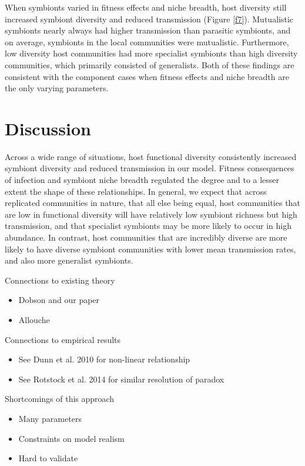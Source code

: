 \documentclass[12pt]{article}
\begin{document}
When symbionts varied in fitness effects and niche breadth, host diversity still increased symbiont diversity and reduced transmission (Figure \ref{f7}). 
Mutualistic symbionts nearly always had higher transmission than parasitic symbionts, and on average, symbionts in the local communities were mutualistic. 
Furthermore, low diversity host communities had more specialist symbionts than high diversity communities, which primarily consisted of generalists. 
Both of these findings are consistent with the component cases when fitness effects and niche breadth are the only varying parameters.

\section*{Discussion}

Across a wide range of situations, host functional diversity consistently increased symbiont diversity and reduced transmission in our model. 
Fitness consequences of infection and symbiont niche breadth regulated the degree and to a lesser extent the shape of these relationships.
In general, we expect that across replicated communities in nature, that all else being equal, host communities that are low in functional diversity will have relatively low symbiont richness but high transmission, and that specialist symbionts may be more likely to occur in high abundance. 
In contrast, host communities that are incredibly diverse are more likely to have diverse symbiont communities with lower mean transmission rates, and also more generalist symbionts. 

Connections to existing theory
\begin{itemize}
	\item Dobson and our paper
	\item Allouche
\end{itemize}

Connections to empirical results
\begin{itemize}
	\item See Dunn et al. 2010 for non-linear relationship
	\item See Rotstock et al. 2014 for similar resolution of paradox
\end{itemize}

Shortcomings of this approach
\begin{itemize}
	\item Many parameters
    \item Constraints on model realism
    \item Hard to validate
\end{itemize}
\end{document}
